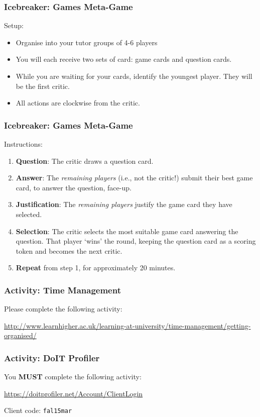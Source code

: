 \begin{frame}
	\frametitle{Icebreaker: Games Meta-Game}
	
	Setup:
	
	\begin{itemize}
		\item Organise into your tutor groups of 4-6 players
		\item You will each receive two sets of card: game cards and question cards.
		\item While you are waiting for your cards, identify the youngest player. They will be the first critic.
		\item All actions are clockwise from the critic.
	\end{itemize}
\end{frame}

\begin{frame}
	\frametitle{Icebreaker: Games Meta-Game}
	
	Instructions:
	
	\begin{enumerate}
		\item 	\textbf{Question}: The critic draws a question card. 
		\item 	\textbf{Answer}: The \textit{remaining players} (i.e., not the critic!) submit their best game card, to answer the question, face-up.
		\item 	\textbf{Justification}: The \textit{remaining players} justify the game card they have selected.
		\item 	\textbf{Selection}: The critic selects the most suitable game card answering the question. That player `wins' the round, keeping the question card as a scoring token and becomes the next critic.	
		\item 	\textbf{Repeat} from step 1, for approximately 20 minutes.	
	\end{enumerate}
\end{frame}

\begin{frame}
	\frametitle{Activity: Time Management}
	
	Please complete the following activity:
	
	\vspace{2em}
	
	\url{http://www.learnhigher.ac.uk/learning-at-university/time-management/getting-organised/}

\end{frame}

\begin{frame}
	\frametitle{Activity: DoIT Profiler}
	
	You \textbf{MUST} complete the following activity:
	
	\vspace{2em}
	
	\url{https://doitprofiler.net/Account/ClientLogin}
	
	\vspace{2em}
	
	Client code: \texttt{fal15mar}

\end{frame}


